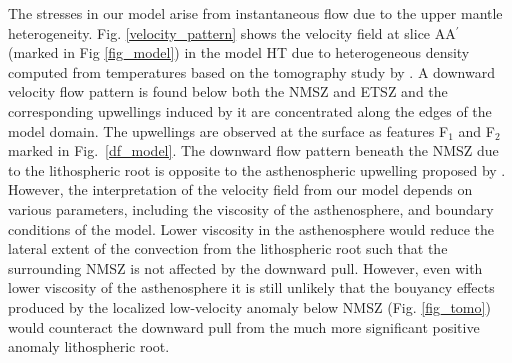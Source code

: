 \documentclass[draft,linenumbers]{agujournal2018}
\begin{document}
    The stresses in our model arise from instantaneous flow due to the upper mantle heterogeneity. Fig. \ref{velocity_pattern} shows the velocity field at slice AA$^{\prime}$ (marked in Fig \ref{fig_model}) in the model HT due to heterogeneous density computed from temperatures based on the tomography study by \citet{Biryol_2016}. A downward velocity flow pattern is found below both the NMSZ and ETSZ and the corresponding upwellings induced by it are concentrated along the edges of the model domain. The upwellings are observed at the surface as features F$_1$ and F$_2$ marked in Fig.~\ref{df_model}. The downward flow pattern beneath the NMSZ due to the lithospheric root is opposite to the asthenospheric upwelling proposed by \citet{Biryol_2016}. However, the interpretation of the velocity field from our model depends on various parameters, including the viscosity of the asthenosphere, and boundary conditions of the model. %
    Lower viscosity in the asthenosphere would reduce the lateral extent of the convection from the lithospheric root such that the surrounding NMSZ is not affected by the downward pull. However, even with lower viscosity of the asthenosphere it is still unlikely that the bouyancy effects produced by the localized low-velocity anomaly below NMSZ (Fig. \ref{fig_tomo}) would counteract the downward pull from the much more significant positive anomaly lithospheric root. 
%    
\end{document}
